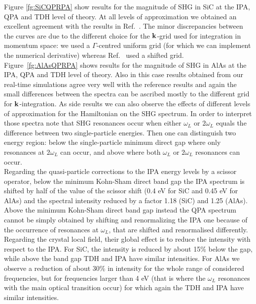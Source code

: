 Figure \ref{fg:SiCQPRPA} show results for the magnitude of SHG in SiC at the IPA, QPA and TDH level of theory. 
At all levels of approximation we obtained an excellent agreement with the results in Ref.~\cite{PhysRevB.82.235201}. The minor discrepancies between the curves are due to the different choice for the ${\bf k}$-grid used for integration in momentum space: we used a $\Gamma$-centred uniform grid (for which we can implement the numerical derivative) whereas Ref.~\cite{PhysRevB.82.235201} used a shifted grid. Figure~\ref{fg:AlAsQPRPA} shows results for the magnitude of SHG in AlAs at the IPA, QPA and TDH level of theory. 
Also in this case results obtained from our real-time simulations agree very well with the reference results and again the small differences between the spectra can be ascribed mostly to the different grid for ${\bf k}$-integration.
As side results we can also observe the effects of different levels of approximation for the Hamiltonian on the SHG spectrum. In order to interpret those spectra note that SHG resonances occur when either $\omega_L$ or $2\omega_L$ equals the difference between two single-particle energies. Then one can distinguish two energy region: below the single-particle minimum direct gap where only resonances at $2\omega_L$ can occur, and above where both $\omega_L$ or $2\omega_L$ resonances  can occur.\\
Regarding the quasi-particle corrections to the IPA energy levels by a scissor operator, below the minimum Kohn-Sham direct band gap the IPA spectrum is shifted by half of the value of the scissor shift (0.4 eV for SiC and 0.45 eV for AlAs) and the spectral intensity reduced by a factor 1.18 (SiC) and  1.25 (AlAs). Above the minimum Kohn-Sham direct band gap instead the QPA spectrum cannot be simply obtained by shifting and renormalizing the IPA one because of the occurrence of resonances at $\omega_{L}$, that are shifted and renormalised differently.\\  
Regarding the crystal local field, their global effect is to reduce the intensity with respect to the IPA. For SiC, the intensity is reduced by about 15\% below the gap, while above the band gap TDH and IPA have similar intensities. For AlAs we observe a reduction of about 30\% in intensity for the whole range of considered frequencies, but for frequencies larger than 4 eV (that is where the $\omega_L$ resonances with the main optical transition occur) for which again the TDH and IPA have similar intensities.
